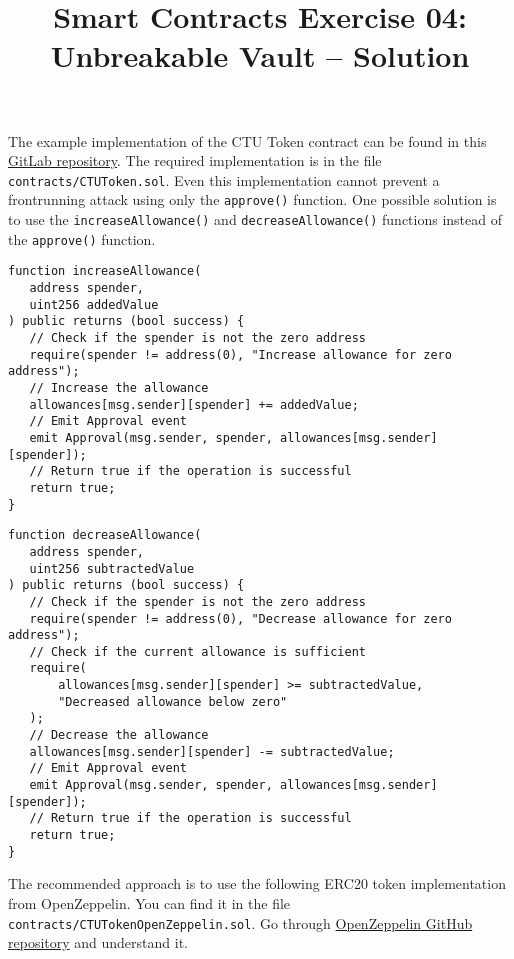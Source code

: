 \documentclass[12pt]{article}
\title{Smart Contracts Exercise 04: \\ Unbreakable Vault -- Solution}
\author{}
\date{}
\begin{document}
\maketitle
The example implementation of the CTU Token contract can be found in this \href{https://gitlab.fel.cvut.cz/radovluk/smart-contracts-exercises/-/tree/main/03-ERC20-CTUToken/solution/solution-code}{GitLab repository}. The required implementation is in the file \texttt{contracts/CTUToken.sol}. Even this implementation cannot prevent a frontrunning attack using only the \texttt{approve()} function. One possible solution is to use the \texttt{increaseAllowance()} and \texttt{decreaseAllowance()} functions instead of the \texttt{approve()} function.

\begin{verbatim}
function increaseAllowance(
   address spender,
   uint256 addedValue
) public returns (bool success) {
   // Check if the spender is not the zero address
   require(spender != address(0), "Increase allowance for zero address");
   // Increase the allowance
   allowances[msg.sender][spender] += addedValue;
   // Emit Approval event
   emit Approval(msg.sender, spender, allowances[msg.sender][spender]);
   // Return true if the operation is successful
   return true;
}
\end{verbatim}

\begin{verbatim}
function decreaseAllowance(
   address spender,
   uint256 subtractedValue
) public returns (bool success) {
   // Check if the spender is not the zero address
   require(spender != address(0), "Decrease allowance for zero address");
   // Check if the current allowance is sufficient
   require(
       allowances[msg.sender][spender] >= subtractedValue,
       "Decreased allowance below zero"
   );
   // Decrease the allowance
   allowances[msg.sender][spender] -= subtractedValue;
   // Emit Approval event
   emit Approval(msg.sender, spender, allowances[msg.sender][spender]);
   // Return true if the operation is successful
   return true;
}
\end{verbatim}

The recommended approach is to use the following ERC20 token implementation from OpenZeppelin. You can find it in the file \texttt{contracts/CTUTokenOpenZeppelin.sol}.
Go through \href{https://github.com/OpenZeppelin/openzeppelin-contracts/blob/master/contracts/token/ERC20/ERC20.sol}{OpenZeppelin GitHub repository} and understand it.
\end{document}

